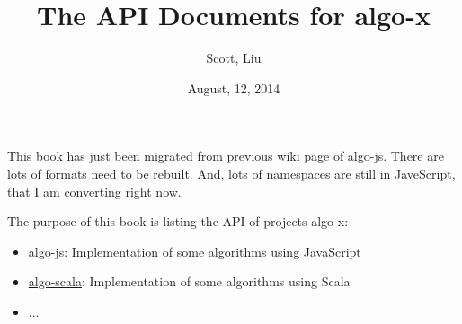 \documentclass{article}
\title{The API Documents for algo-x}
\author{Scott, Liu}
\date{August, 12, 2014}
\newcommand{\scotv}{https://github.com/scotv}
\begin{document}
\maketitle

This book has just been migrated from previous wiki page of \href{\scotv/algo-js}{algo-js}. There are lots of formats need to be rebuilt. And, lots of namespaces are still in JaveScript, that I am converting right now.

The purpose of this book is listing the API of projects algo-x:

\begin{itemize}
	\item \href{\scotv/algo-js}{algo-js}: Implementation of some algorithms using JavaScript
	\item \href{\scotv/algo-scala}{algo-scala}: Implementation of some algorithms using Scala
	\item ...
\end{itemize}


\end{document}
